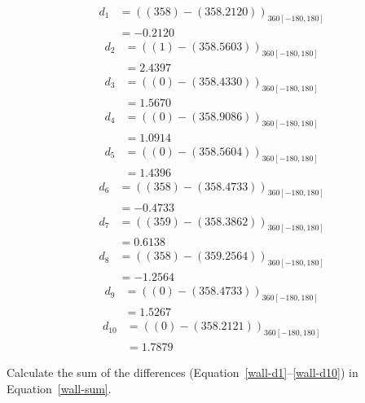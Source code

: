 \documentclass[twocolumn]{article}
\begin{document}
\begin{align}
d_{1} &= ((358) - (358.2120))_{360[-180,180]} \nonumber\\
 &= -0.2120 \label{wall-d1}
\end{align}
\begin{align}
d_{2} &= ((1) - (358.5603))_{360[-180,180]} \nonumber\\
 &= 2.4397 \label{wall-d2}
\end{align}
\begin{align}
d_{3} &= ((0) - (358.4330))_{360[-180,180]} \nonumber\\
 &= 1.5670 \label{wall-d3}
\end{align}
\begin{align}
d_{4} &= ((0) - (358.9086))_{360[-180,180]} \nonumber\\
 &= 1.0914 \label{wall-d4}
\end{align}
\begin{align}
d_{5} &= ((0) - (358.5604))_{360[-180,180]} \nonumber\\
 &= 1.4396 \label{wall-d5}
\end{align}
\begin{align}
d_{6} &= ((358) - (358.4733))_{360[-180,180]} \nonumber\\
 &= -0.4733 \label{wall-d6}
\end{align}
\begin{align}
d_{7} &= ((359) - (358.3862))_{360[-180,180]} \nonumber\\
 &= 0.6138 \label{wall-d7}
\end{align}
\begin{align}
d_{8} &= ((358) - (359.2564))_{360[-180,180]} \nonumber\\
 &= -1.2564 \label{wall-d8}
\end{align}
\begin{align}
d_{9} &= ((0) - (358.4733))_{360[-180,180]} \nonumber\\
 &= 1.5267 \label{wall-d9}
\end{align}
\begin{align}
d_{10} &= ((0) - (358.2121))_{360[-180,180]} \nonumber\\
 &= 1.7879 \label{wall-d10}
\end{align}

Calculate the sum of the differences (Equation~\ref{wall-d1}--\ref{wall-d10}) in Equation~\ref{wall-sum}.
\end{document}
